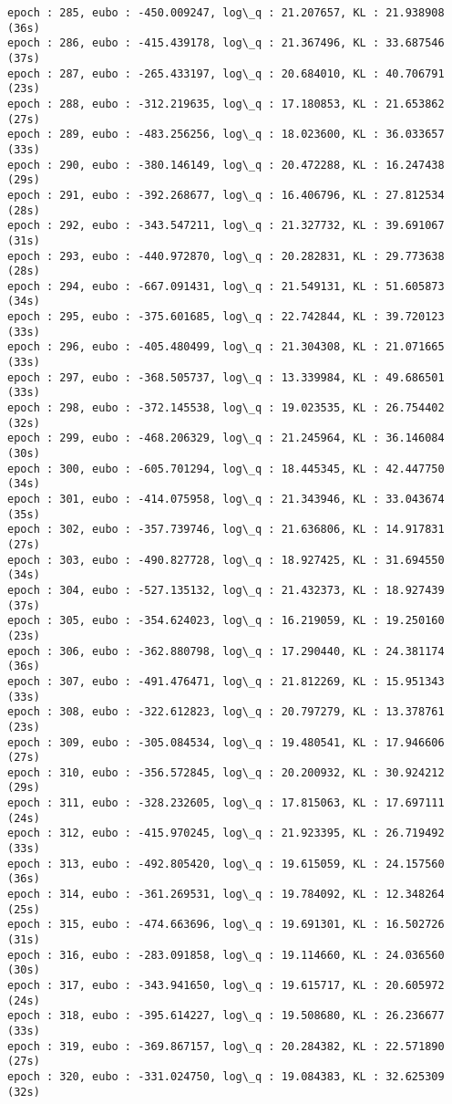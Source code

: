 \documentclass[11pt]{article}
\begin{document}
\begin{Verbatim}[commandchars=\\\{\}]
epoch : 285, eubo : -450.009247, log\_q : 21.207657, KL : 21.938908 (36s)
epoch : 286, eubo : -415.439178, log\_q : 21.367496, KL : 33.687546 (37s)
epoch : 287, eubo : -265.433197, log\_q : 20.684010, KL : 40.706791 (23s)
epoch : 288, eubo : -312.219635, log\_q : 17.180853, KL : 21.653862 (27s)
epoch : 289, eubo : -483.256256, log\_q : 18.023600, KL : 36.033657 (33s)
epoch : 290, eubo : -380.146149, log\_q : 20.472288, KL : 16.247438 (29s)
epoch : 291, eubo : -392.268677, log\_q : 16.406796, KL : 27.812534 (28s)
epoch : 292, eubo : -343.547211, log\_q : 21.327732, KL : 39.691067 (31s)
epoch : 293, eubo : -440.972870, log\_q : 20.282831, KL : 29.773638 (28s)
epoch : 294, eubo : -667.091431, log\_q : 21.549131, KL : 51.605873 (34s)
epoch : 295, eubo : -375.601685, log\_q : 22.742844, KL : 39.720123 (33s)
epoch : 296, eubo : -405.480499, log\_q : 21.304308, KL : 21.071665 (33s)
epoch : 297, eubo : -368.505737, log\_q : 13.339984, KL : 49.686501 (33s)
epoch : 298, eubo : -372.145538, log\_q : 19.023535, KL : 26.754402 (32s)
epoch : 299, eubo : -468.206329, log\_q : 21.245964, KL : 36.146084 (30s)
epoch : 300, eubo : -605.701294, log\_q : 18.445345, KL : 42.447750 (34s)
epoch : 301, eubo : -414.075958, log\_q : 21.343946, KL : 33.043674 (35s)
epoch : 302, eubo : -357.739746, log\_q : 21.636806, KL : 14.917831 (27s)
epoch : 303, eubo : -490.827728, log\_q : 18.927425, KL : 31.694550 (34s)
epoch : 304, eubo : -527.135132, log\_q : 21.432373, KL : 18.927439 (37s)
epoch : 305, eubo : -354.624023, log\_q : 16.219059, KL : 19.250160 (23s)
epoch : 306, eubo : -362.880798, log\_q : 17.290440, KL : 24.381174 (36s)
epoch : 307, eubo : -491.476471, log\_q : 21.812269, KL : 15.951343 (33s)
epoch : 308, eubo : -322.612823, log\_q : 20.797279, KL : 13.378761 (23s)
epoch : 309, eubo : -305.084534, log\_q : 19.480541, KL : 17.946606 (27s)
epoch : 310, eubo : -356.572845, log\_q : 20.200932, KL : 30.924212 (29s)
epoch : 311, eubo : -328.232605, log\_q : 17.815063, KL : 17.697111 (24s)
epoch : 312, eubo : -415.970245, log\_q : 21.923395, KL : 26.719492 (33s)
epoch : 313, eubo : -492.805420, log\_q : 19.615059, KL : 24.157560 (36s)
epoch : 314, eubo : -361.269531, log\_q : 19.784092, KL : 12.348264 (25s)
epoch : 315, eubo : -474.663696, log\_q : 19.691301, KL : 16.502726 (31s)
epoch : 316, eubo : -283.091858, log\_q : 19.114660, KL : 24.036560 (30s)
epoch : 317, eubo : -343.941650, log\_q : 19.615717, KL : 20.605972 (24s)
epoch : 318, eubo : -395.614227, log\_q : 19.508680, KL : 26.236677 (33s)
epoch : 319, eubo : -369.867157, log\_q : 20.284382, KL : 22.571890 (27s)
epoch : 320, eubo : -331.024750, log\_q : 19.084383, KL : 32.625309 (32s)

\end{Verbatim}
\end{document}
